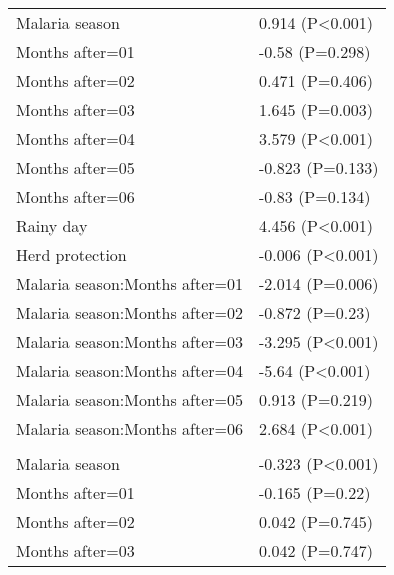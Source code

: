 \documentclass[]{article}
\begin{document}
\begin{longtable}[t]{ll}
\hspace{1em}Malaria season & 0.914 (P<0.001)\\
\hspace{1em}Months after=01 & -0.58 (P=0.298)\\
\hspace{1em}Months after=02 & 0.471 (P=0.406)\\
\hspace{1em}Months after=03 & 1.645 (P=0.003)\\
\hspace{1em}Months after=04 & 3.579 (P<0.001)\\
\hspace{1em}Months after=05 & -0.823 (P=0.133)\\
\hspace{1em}Months after=06 & -0.83 (P=0.134)\\
\hspace{1em}Rainy day & 4.456 (P<0.001)\\
\hspace{1em}Herd protection & -0.006 (P<0.001)\\
\hspace{1em}Malaria season:Months after=01 & -2.014 (P=0.006)\\
\hspace{1em}Malaria season:Months after=02 & -0.872 (P=0.23)\\
\hspace{1em}Malaria season:Months after=03 & -3.295 (P<0.001)\\
\hspace{1em}Malaria season:Months after=04 & -5.64 (P<0.001)\\
\hspace{1em}Malaria season:Months after=05 & 0.913 (P=0.219)\\
\hspace{1em}Malaria season:Months after=06 & 2.684 (P<0.001)\\
\addlinespace[1.5em]
\multicolumn{2}{l}{\textbf{Temporary field worker}}\\
\hspace{1em}Malaria season & -0.323 (P<0.001)\\
\hspace{1em}Months after=01 & -0.165 (P=0.22)\\
\hspace{1em}Months after=02 & 0.042 (P=0.745)\\
\hspace{1em}Months after=03 & 0.042 (P=0.747)\\

\end{longtable}
\end{document}
